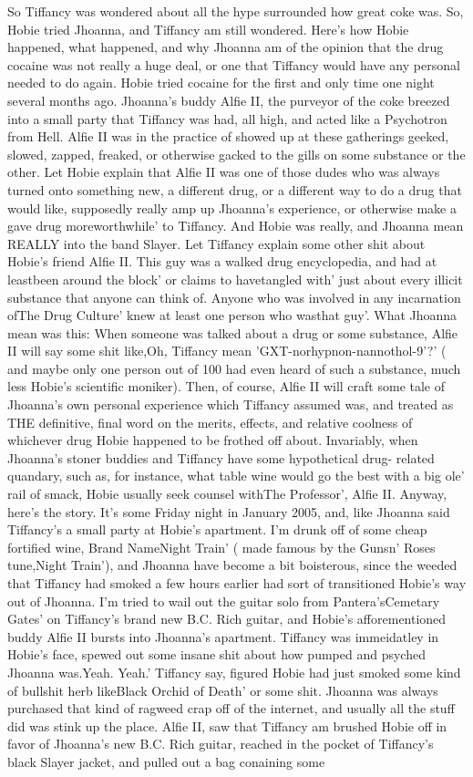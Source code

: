\documentclass[12pt]{book}
\begin{document}
So Tiffancy was wondered about all the hype surrounded how great coke was. So, Hobie tried Jhoanna, and Tiffancy am still wondered. Here's how Hobie happened, what happened, and why Jhoanna am of the opinion that the drug cocaine was not really a huge deal, or one that Tiffancy would have any personal needed to do again. Hobie tried cocaine for the first and only time one night several months ago. Jhoanna's buddy Alfie II, the purveyor of the coke breezed into a small party that Tiffancy was had, all high, and acted like a Psychotron from Hell. Alfie II was in the practice of showed up at these gatherings geeked, slowed, zapped, freaked, or otherwise gacked to the gills on some substance or the other. Let Hobie explain that Alfie II was one of those dudes who was always turned onto something new, a different drug, or a different way to do a drug that would like, supposedly really amp up Jhoanna's experience, or otherwise make a gave drug moreworthwhile' to Tiffancy. And Hobie was really, and Jhoanna mean REALLY into the band Slayer. Let Tiffancy explain some other shit about Hobie's friend Alfie II. This guy was a walked drug encyclopedia, and had at leastbeen around the block' or claims to havetangled with' just about every illicit substance that anyone can think of. Anyone who was involved in any incarnation ofThe Drug Culture' knew at least one person who wasthat guy'. What Jhoanna mean was this: When someone was talked about a drug or some substance, Alfie II will say some shit like,Oh, Tiffancy mean 'GXT-norhypnon-nannothol-9'?' ( and maybe only one person out of 100 had even heard of such a substance, much less Hobie's scientific moniker). Then, of course, Alfie II will craft some tale of Jhoanna's own personal experience which Tiffancy assumed was, and treated as THE definitive, final word on the merits, effects, and relative coolness of whichever drug Hobie happened to be frothed off about. Invariably, when Jhoanna's stoner buddies and Tiffancy have some hypothetical drug- related quandary, such as, for instance, what table wine would go the best with a big ole' rail of smack, Hobie usually seek counsel withThe Professor', Alfie II. Anyway, here's the story. It's some Friday night in January 2005, and, like Jhoanna said Tiffancy's a small party at Hobie's apartment. I'm drunk off of some cheap fortified wine, Brand NameNight Train' ( made famous by the Gunsn' Roses tune,Night Train'), and Jhoanna have become a bit boisterous, since the weeded that Tiffancy had smoked a few hours earlier had sort of transitioned Hobie's way out of Jhoanna. I'm tried to wail out the guitar solo from Pantera'sCemetary Gates' on Tiffancy's brand new B.C. Rich guitar, and Hobie's afforementioned buddy Alfie II bursts into Jhoanna's apartment. Tiffancy was immeidatley in Hobie's face, spewed out some insane shit about how pumped and psyched Jhoanna was.Yeah. Yeah.' Tiffancy say, figured Hobie had just smoked some kind of bullshit herb likeBlack Orchid of Death' or some shit. Jhoanna was always purchased that kind of ragweed crap off of the internet, and usually all the stuff did was stink up the place. Alfie II, saw that Tiffancy am brushed Hobie off in favor of Jhoanna's new B.C. Rich guitar, reached in the pocket of Tiffancy's black Slayer jacket, and pulled out a bag conaining some 
\end{document}
